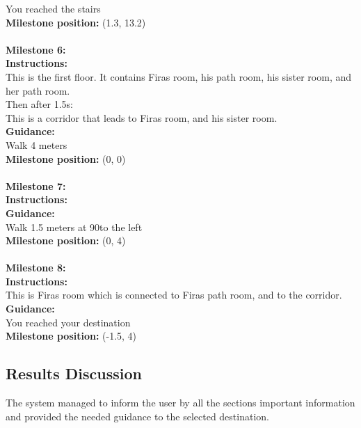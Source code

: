 You reached the stairs\\
\textbf{Milestone position:} (1.3, 13.2)\\
\\
\textbf{Milestone 6:}\\
\textbf{Instructions:}\\
This is the first floor. It contains Firas room, his path room, his sister room, and her path room.\\
\color{green}Then after 1.5s:\color{black}\\
This is a corridor that leads to Firas room, and his sister room.\\
\textbf{Guidance:}\\
Walk 4 meters\\
\textbf{Milestone position:} (0, 0)\\
\\
\textbf{Milestone 7:}\\
\textbf{Instructions:}\\
\textbf{Guidance:}\\
Walk 1.5 meters at 90\textdegree to the left\\
\textbf{Milestone position:} (0, 4)\\
\\
\textbf{Milestone 8:}\\
\textbf{Instructions:}\\
This is Firas room which is connected to Firas path room, and to the corridor.\\
\textbf{Guidance:}\\
You reached your destination\\
\textbf{Milestone position:} (-1.5, 4)\\

\subsection{Results Discussion}
The system managed to inform the user by all the sections important information and provided the needed guidance to the selected destination.